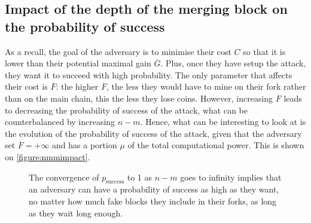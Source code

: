 \subsection{Impact of the depth of the merging block on the probability of success}

As a recall, the goal of the adversary is to minimise their cost \(C\) so that it is lower than their potential maximal gain \(\overline{G}\). Plus, once they have setup the attack, they want it to succeed with high probability. The only parameter that affects their cost is \(\overline{F}\): the higher \(\overline{F}\), the less they would have to mine on their fork rather than on the main chain, this the less they lose coins. However, increasing \(\overline{F}\) leads to decreasing the probability of success of the attack, what can be counterbalanced by increasing \(n-m\). Hence, what can be interesting to look at is the evolution of the probability of success of the attack, given that the adversary set \(\overline{F}=+\infty\) and has a portion \(\mu\) of the total computational power. This is shown on \autoref{figure:nmmimpact}.

\begin{figure}[ht]
    \centering
    \caption{The convergence of \(p_{\text{success}}\) to 1 as \(n - m\) goes to infinity implies that an adversary can have a probability of success as high as they want, no matter how much fake blocks they include in their forks, as long as they wait long enough.}
    \label{figure:nmmimpact}
\end{figure}

